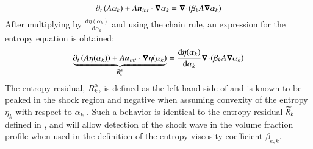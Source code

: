 \documentclass[preprint,10pt]{elsarticle}
\begin{document}
%
\begin{equation}\label{eq:vf-sem-sct4}
\partial_t \left(A \alpha_k \right) + A \boldsymbol u_{int} \cdot \boldsymbol\nabla \alpha_k = \boldsymbol\nabla\! \cdot \! \left( \beta_k A \boldsymbol\nabla \alpha_k \right)
\end{equation}
% 
After multiplying by $\frac{\text{d} \eta (\alpha_k)}{\text{d} \alpha_k}$ and using the chain rule, an expression for the entropy equation is obtained:
%
\begin{equation}\label{eq:vf-sem2-sct4}
\underbrace{\partial_t \left(A \eta(\alpha_k) \right) + A \boldsymbol u_{int} \cdot \boldsymbol\nabla \eta(\alpha_k)}_{R_{k}^\alpha} = \frac{\text{d} \eta (\alpha_k)}{\text{d} \alpha_k} \boldsymbol\nabla\! \cdot \! \left( \beta_k A \boldsymbol\nabla \alpha_k \right)
\end{equation}
% 
The entropy residual, $R_{k}^\alpha$, is defined as the left hand side of  and is known to be peaked in the shock region and negative when assuming convexity of the entropy $\eta_k$ with respect to $\alpha_k$ \cite{Leveque}. Such a behavior is identical to the entropy residual $\widetilde{R}_k$ defined in , and will allow detection of the shock wave in the volume fraction profile when used in the definition of the entropy viscosity coefficient $\beta_{e,k}$.
%
\end{document}
